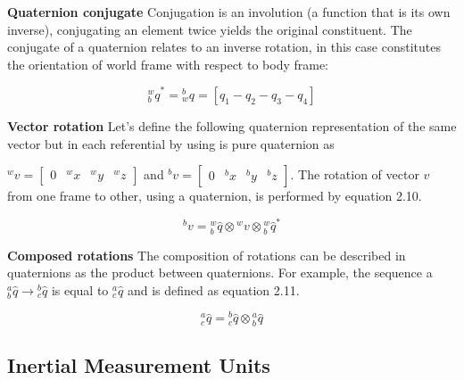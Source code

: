 \item \textbf{Quaternion conjugate} Conjugation is an involution (a function that is its own inverse), conjugating an element twice yields the original constituent. The conjugate of a quaternion relates to an inverse rotation, in this case constitutes the orientation of world frame with respect to body frame:

\begin{equation}
  \textrm{$_{b}^{w}q$}^* =\textrm{$_{w}^{b}q$} = \left[q_1 - q_2 - q_3 - q_4\right]
\end{equation}

\item \textbf{Vector rotation} Let's define the following quaternion representation of the same vector but in each referential by using is pure quaternion as

$ ^wv = \begin{bmatrix}
    0 & ^wx & ^wy & ^wz
  \end{bmatrix} $
and
$^bv = \begin{bmatrix}
    0 & ^bx & ^by & ^bz
  \end{bmatrix} $. The rotation of vector $v$ from one frame to other, using a quaternion, is performed by equation 2.10.

\begin{equation}
  \textrm{$^{b}v$} = \textrm{$_{b}^{w}\hat{q}$} \otimes \textrm{$^{w}v$} \otimes \textrm{$_{b}^{w}\hat{q}$}^*
\end{equation}

\item \textbf{Composed rotations} The composition of rotations can be described in quaternions as the product between quaternions. For example, the sequence a $^a_b\hat{q} \rightarrow {^b_c\hat{q}}$ is equal to $^a_c{\hat{q}}$ and is defined as equation 2.11.


\begin{equation}
  \textrm{$_{c}^{a}\hat{q}$} = \textrm{$_{c}^{b}\hat{q}$} \otimes \textrm{$_{b}^{a}\hat{q}$}
\end{equation}

\subsection{Inertial Measurement Units}

